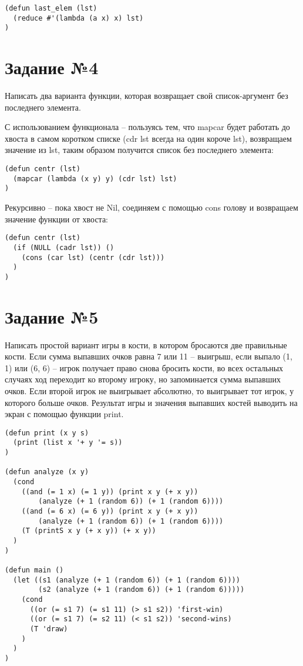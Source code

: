 \begin{lstlisting}
(defun last_elem (lst)
  (reduce #'(lambda (a x) x) lst)
)
\end{lstlisting}

\section{Задание №4}
Написать два варианта функции, которая возвращает свой список-аргумент без
последнего элемента.

С использованием функционала -- пользуясь тем, что mapcar будет работать до хвоста в самом коротком списке (cdr lst всегда на один короче lst), возвращаем значение из lst, таким образом получится список без последнего элемента:

\begin{lstlisting}
(defun centr (lst)
  (mapcar (lambda (x y) y) (cdr lst) lst)
)
\end{lstlisting}

Рекурсивно -- пока хвост не Nil, соединяем с помощью cons голову и возвращаем значение функции от хвоста:

\begin{lstlisting}
(defun centr (lst)
  (if (NULL (cadr lst)) ()
    (cons (car lst) (centr (cdr lst)))
  )
)
\end{lstlisting}

\section{Задание №5}
Написать простой вариант игры в кости, в котором бросаются две правильные
кости. Если сумма выпавших очков равна 7 или 11 -- выигрыш, если выпало
(1, 1) или (6, 6) -- игрок получает право снова бросить кости, во всех остальных
случаях ход переходит ко второму игроку, но запоминается сумма выпавших
очков. Если второй игрок не выигрывает абсолютно, то выигрывает тот игрок,
у которого больше очков. Результат игры и значения выпавших костей выводить
на экран с помощью функции print.

\begin{lstlisting}
(defun print (x y s)
  (print (list x '+ y '= s))
)

(defun analyze (x y)
  (cond
    ((and (= 1 x) (= 1 y)) (print x y (+ x y))
        (analyze (+ 1 (random 6)) (+ 1 (random 6))))
    ((and (= 6 x) (= 6 y)) (print x y (+ x y))
        (analyze (+ 1 (random 6)) (+ 1 (random 6))))
    (T (printS x y (+ x y)) (+ x y))
  )
)

(defun main ()
  (let ((s1 (analyze (+ 1 (random 6)) (+ 1 (random 6))))
        (s2 (analyze (+ 1 (random 6)) (+ 1 (random 6)))))
    (cond
      ((or (= s1 7) (= s1 11) (> s1 s2)) 'first-win)
      ((or (= s1 7) (= s2 11) (< s1 s2)) 'second-wins)
      (T 'draw)
    )
  )
)
\end{lstlisting}
